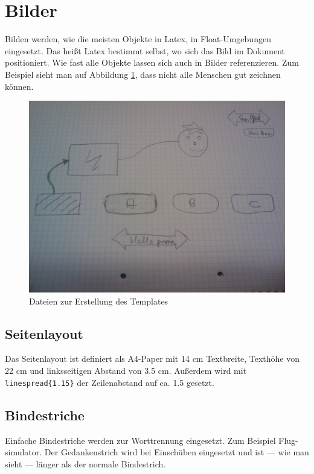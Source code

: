\documentclass[11pt,a4paper]{report}
\begin{document}
\section{Bilder}  \label{sec:bil}
Bilden werden, wie die meisten Objekte in Latex, in Float-Umgebungen eingesetzt. Das heißt Latex bestimmt selbst, wo sich das Bild im Dokument positioniert. Wie fast alle Objekte lassen sich auch in Bilder referenzieren. Zum Beispiel sieht man auf Abbildung \ref{fig:templateprozess}, dass nicht alle Menschen gut zeichnen können.

\begin{figure}[htp] %
\centering
\includegraphics[width=.9\textwidth]{images/zeichnungdraft} %
\caption{Dateien zur Erstellung des Templates}
\label{fig:templateprozess}
\end{figure}

\subsection{Seitenlayout}
Das Seitenlayout ist definiert als A4-Paper mit 14 cm Textbreite, Texthöhe von 22 cm und linksseitigen Abstand von 3.5 cm. Außerdem wird mit \verb|linespread{1.15}| der Zeilenabstand auf ca. 1.5 gesetzt.

\subsection{Bindestriche}
Einfache Bindestriche werden zur Worttrennung eingesetzt. Zum Beispiel Flug-simulator. Der Gedankenstrich wird bei Einschüben eingesetzt und ist --- wie man sieht --- länger als der normale Bindestrich.
\end{document}
